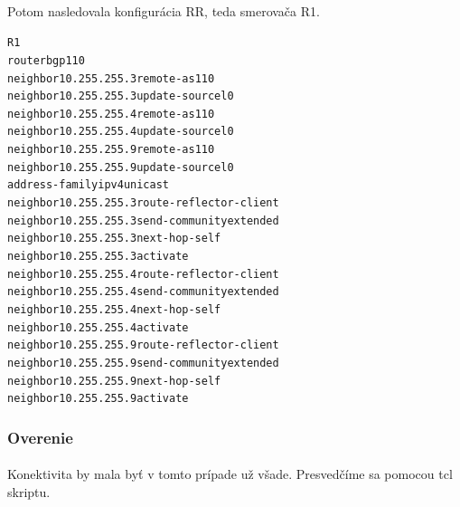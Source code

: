 \documentclass[12pt,twoside,a4paper]{report}
\begin{document}
\paragraph{}
Potom nasledovala konfigurácia RR, teda smerovača R1.

\noindent
{\selectfont
\begin{small}
\begin{alltt}
R1
router bgp 110
  neighbor 10.255.255.3 remote-as 110
  neighbor 10.255.255.3 update-source l0
  neighbor 10.255.255.4 remote-as 110
  neighbor 10.255.255.4 update-source l0
  neighbor 10.255.255.9 remote-as 110
  neighbor 10.255.255.9 update-source l0
  address-family ipv4 unicast
    neighbor 10.255.255.3 route-reflector-client
    neighbor 10.255.255.3 send-community extended
    neighbor 10.255.255.3 next-hop-self
    neighbor 10.255.255.3 activate
    neighbor 10.255.255.4 route-reflector-client
    neighbor 10.255.255.4 send-community extended
    neighbor 10.255.255.4 next-hop-self
    neighbor 10.255.255.4 activate
    neighbor 10.255.255.9 route-reflector-client
    neighbor 10.255.255.9 send-community extended
    neighbor 10.255.255.9 next-hop-self
    neighbor 10.255.255.9 activate 
\end{alltt}
\end{small}
}

\subsubsection{Overenie}
\paragraph{}
Konektivita by mala byť v tomto prípade už všade. Presvedčíme sa pomocou tcl skriptu.
\end{document}
